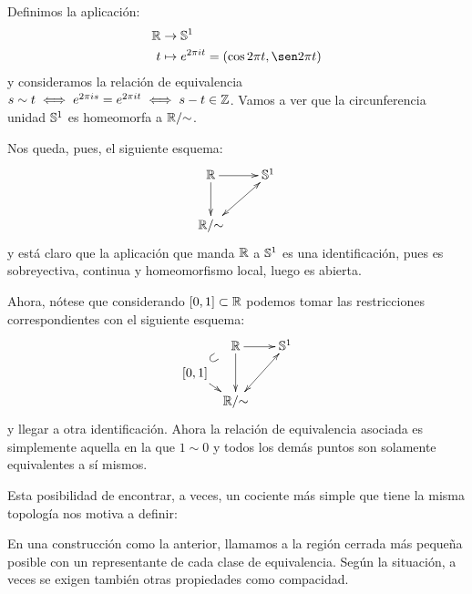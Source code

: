 \begin{exa}
	Definimos la aplicación:
	\[\begin{split}
	\R&\to\esfera^1 \\
	t&\mapsto e^{2\pi it}=(\cos 2\pi t,\sen 2\pi t)
	\end{split}\]
	y consideramos la relación de equivalencia $s\sim t\iff e^{2\pi is}=e^{2\pi it}\iff s-t\in\mathbb{Z}$. Vamos a ver que la circunferencia unidad $\mathbb{S}^1$ es homeomorfa a $\mathbb{R}/\mathord{\sim}$.
	
	Nos queda, pues, el siguiente esquema:
	\[\xymatrix{
		\R \ar[r] \ar[d] &
		\esfera^1 \\
		\R/\mathord{\sim}  \ar@{<->}[ru]
	}\]
	y está claro que la aplicación que manda $\mathbb{R}$ a $\mathbb{S}^1$ es una identificación, pues es sobreyectiva, continua y homeomorfismo local, luego es abierta.
	
	Ahora, nótese que considerando $[0,1]\subset\mathbb{R}$ podemos tomar las restricciones correspondientes con el siguiente esquema:
	\[\xymatrix @C=0.5pc @R=0.5pc @L=-0.2pc {
		& \R \ar[rr] \ar[dd] & &
		\esfera^1 \\
		[0,1] \ar@{}[ur]^*[@]{\subset} \ar[dr] \\
		& \R/\mathord{\sim}  \ar@{<->}[rruu]
	}\]
	y llegar a otra identificación. Ahora la relación de equivalencia asociada es simplemente aquella en la que $1\sim 0$ y todos los demás puntos son solamente equivalentes a sí mismos.
\end{exa}

Esta posibilidad de encontrar, a veces, un cociente más simple que tiene la misma topología nos motiva a definir:

\begin{defi}
	En una construcción como la anterior, llamamos  a la región cerrada más pequeña posible con un representante de cada clase de equivalencia. Según la situación, a veces se exigen también otras propiedades como compacidad.
\end{defi}

